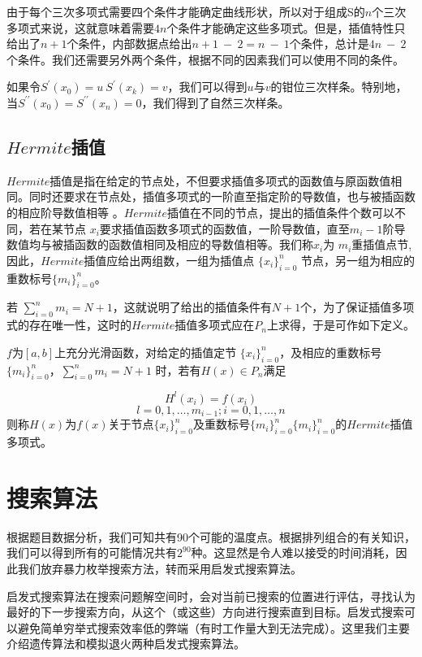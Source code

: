 \documentclass[10.5pt,twocolumn]{jbuaa}
\begin{document}
由于每个三次多项式需要四个条件才能确定曲线形状，所以对于组成S的$n$个三次多项式来说，这就意味着需要$4n$个条件才能确定这些多项式。但是，插值特性只给出了$n + 1$个条件，内部数据点给出$n + 1\ −\ 2 = n\ −\ 1$个条件，总计是$4n\ −\ 2$个条件。我们还需要另外两个条件，根据不同的因素我们可以使用不同的条件。

如果令$S^{\prime}(x_0) = u\ S^{\prime}(x_k) = v$，我们可以得到$u$与$v$的钳位三次样条。特别地，当$S^{\prime\prime}(x_0) = S^{\prime\prime}(x_n) = 0$，我们得到了自然三次样条。
\subsection{$Hermite$插值}
$Hermite$插值是指在给定的节点处，不但要求插值多项式的函数值与原函数值相同。同时还要求在节点处，插值多项式的一阶直至指定阶的导数值，也与被插函数的相应阶导数值相等 。$Hermite$插值在不同的节点，提出的插值条件个数可以不同，若在某节点 $x_{i}$要求插值函数多项式的函数值，一阶导数值，直至$m_{i}-1$阶导数值均与被插函数的函数值相同及相应的导数值相等。我们称$x_{i}$为 $m_{i}$重插值点节,因此，$Hermite$插值应给出两组数，一组为插值点 $\{x_{i}\}_{i=0}^{n}$ 节点，另一组为相应的重数标号$\displaystyle \{m_{i}\}_{i=0}^{n}$。 

若 $\sum _{i=0}^{n}m_{i}=N+1$，这就说明了给出的插值条件有$N+1$个，为了保证插值多项式的存在唯一性，这时的$Hermite$插值多项式应在$P_{n}$上求得，于是可作如下定义。

$f$为$[a,b]$上充分光滑函数，对给定的插值定节 $\{x_{i}\}_{i=0}^{n}$，及相应的重数标号$\{m_{i}\}_{i=0}^{n}$，$\sum_{i=0}^n m_i = N+1$ 时，若有$H(x) \in P_{n}$满足

\begin{equation}
	H^l(x_i) = f(x_i)
\end{equation}
\begin{displaymath}
l=0,1,\ldots,m_{i-1};i=0,1,\ldots,n
\end{displaymath}
则称$H(x)$为$f(x)$关于节点$\{x_{i}\}_{i=0}^{n}$及重数标号$\{m_{i}\}_{i=0}^{n}$$\{m_{i}\}_{i=0}^{n}$的$Hermite$插值多项式。
\section{搜索算法}
根据题目数据分析，我们可知共有90个可能的温度点。根据排列组合的有关知识，我们可以得到所有的可能情况共有$2^{90}$种。这显然是令人难以接受的时间消耗，因此我们放弃暴力枚举搜索方法，转而采用启发式搜索算法。

启发式搜索算法在搜索问题解空间时，会对当前已搜索的位置进行评估，寻找认为最好的下一步搜索方向，从这个（或这些）方向进行搜索直到目标。启发式搜索可以避免简单穷举式搜索效率低的弊端（有时工作量大到无法完成）。这里我们主要介绍遗传算法和模拟退火两种启发式搜索算法。
\end{document}
